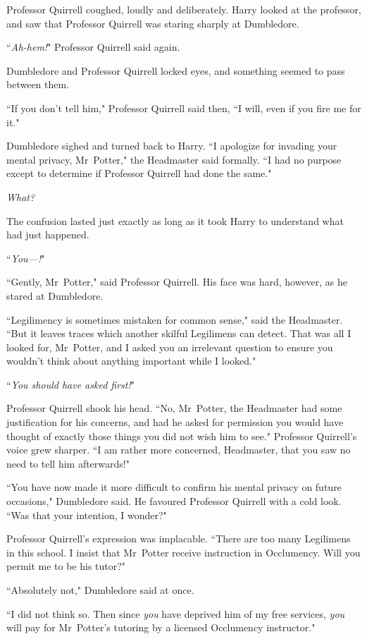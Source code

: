 Professor Quirrell coughed, loudly and deliberately. Harry looked at the professor, and saw that Professor Quirrell was staring sharply at Dumbledore.

``\emph{Ah-hem!}" Professor Quirrell said again.

Dumbledore and Professor Quirrell locked eyes, and something seemed to pass between them.

``If you don't tell him," Professor Quirrell said then, ``I will, even if you fire me for it."

Dumbledore sighed and turned back to Harry. ``I apologize for invading your mental privacy, Mr~Potter," the Headmaster said formally. ``I had no purpose except to determine if Professor Quirrell had done the same."

\emph{What?}

The confusion lasted just exactly as long as it took Harry to understand what had just happened.

``\emph{You—!}"

``Gently, Mr~Potter," said Professor Quirrell. His face was hard, however, as he stared at Dumbledore.

``Legilimency is sometimes mistaken for common sense," said the Headmaster. ``But it leaves traces which another skilful Legilimens can detect. That was all I looked for, Mr~Potter, and I asked you an irrelevant question to ensure you wouldn't think about anything important while I looked."

``\emph{You should have asked first!}"

Professor Quirrell shook his head. ``No, Mr~Potter, the Headmaster had some justification for his concerns, and had he asked for permission you would have thought of exactly those things you did not wish him to see." Professor Quirrell's voice grew sharper. ``I am rather more concerned, Headmaster, that you saw no need to tell him afterwards!"

``You have now made it more difficult to confirm his mental privacy on future occasions," Dumbledore said. He favoured Professor Quirrell with a cold look. ``Was that your intention, I wonder?"

Professor Quirrell's expression was implacable. ``There are too many Legilimens in this school. I insist that Mr~Potter receive instruction in Occlumency. Will you permit me to be his tutor?"

``Absolutely not," Dumbledore said at once.

``I did not think so. Then since \emph{you} have deprived him of my free services, \emph{you} will pay for Mr~Potter's tutoring by a licensed Occlumency instructor."

